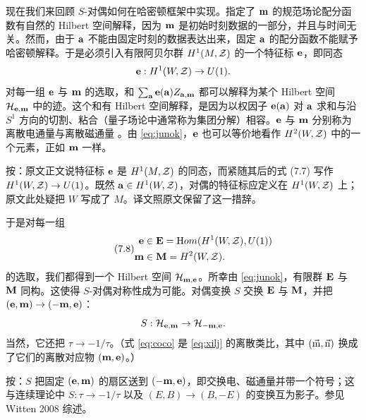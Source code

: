 现在我们来回顾 $S$-对偶如何在哈密顿框架中实现。指定了 ${\bf m}$ 的规范场论配分函数有自然的 Hilbert 空间解释，因为 ${\bf m}$ 是初始时刻数据的一部分，并且与时间无关。然而，由于 ${\bf a}$ 不能由固定时刻的数据表达出来，固定 ${\bf a}$ 的配分函数不能赋予哈密顿解释。于是必须引入有限阿贝尔群 $H^1(M,\CZ)$ 的一个特征标 ${\bf e}$，即同态
\setcounter{equation}{6}
\begin{equation}\label{eq:kilno}
{\bf e}:H^1(W,\CZ)\to U(1).
\end{equation}
对每一组 ${\bf e}$ 与 ${\bf m}$ 的选取，和 $\sum_{{\bf a}}{\bf e}({\bf a})Z_{{\bf a},{\bf m}}$ 都可以解释为某个 Hilbert 空间 ${\cal H}_{{\bf e},{\bf m}}$ 中的迹。这个和有 Hilbert 空间解释，是因为以权因子 ${\bf e}({\bf a})$ 对 ${\bf a}$ 求和与沿 $S^1$ 方向的切割、粘合（量子场论中通常称为集团分解）相容。${\bf e}$ 与 ${\bf m}$ 分别称为离散电通量与离散磁通量 \cite{ref101}。由 \eqref{eq:junok}，${\bf e}$ 也可以等价地看作 $H^2(W,\CZ)$ 中的一个元素，正如 ${\bf m}$ 一样。

\begin{yizhu}[原文疑误]
按：原文正文说特征标 ${\bf e}$ 是 $H^1(M,\CZ)$ 的同态，而紧随其后的式 (7.7) 写作 $H^1(W,\CZ)\to U(1)$。既然 ${\bf a}\in H^1(W,\CZ)$，对偶的特征标应定义在 $H^1(W,\CZ)$ 上；原文此处疑把 $W$ 写成了 $M$。译文照原文保留了这一措辞。
\end{yizhu}

于是对每一组
\begin{equation*}
\tag*{(7.8)}
\begin{aligned}{\bf e}&\in {\bf E}={\rm
Hom}(H^1(W,\CZ), U(1))\\
                             {\bf m}& \in {\bf M}=H^2(W,\CZ).
\end{aligned}
\end{equation*}
的选取，我们都得到一个 Hilbert 空间 ${\cal H}_{{\bf m},{\bf e}}$。所幸由 \eqref{eq:junok}，有限群 ${\bf E}$ 与 ${\bf M}$ 同构。这使得 $S$-对偶对称性成为可能。对偶变换 $S$ 交换 ${\bf E}$ 与 ${\bf M}$，并把 $({\bf e},{\bf m})\to (-{\bf m},{\bf e})$：
\setcounter{equation}{8}
\begin{equation}\label{eq:coco}
S:{\cal H}_{{\bf e},{\bf m}}\to {\cal H}_{-{\bf m},{\bf
e}}.
\end{equation}
当然，它还把 $\tau\to -1/\tau$。（式 \eqref{eq:coco} 是 \eqref{eq:xilj} 的离散类比，其中 $(\vec{\eurm m},\vec{\eurm n})$ 换成了它们的离散对应物 $({\bf m},{\bf e})$。）

\begin{yizhu}[物理图像]
按：$S$ 把固定 $({\bf e},{\bf m})$ 的扇区送到 $(-{\bf m},{\bf e})$，即交换电、磁通量并带一个符号；这与连续理论中 $S:\tau\to-1/\tau$ 以及 $(E,B)\to(B,-E)$ 的变换互为影子。参见 Witten 2008 综述。
\end{yizhu}

